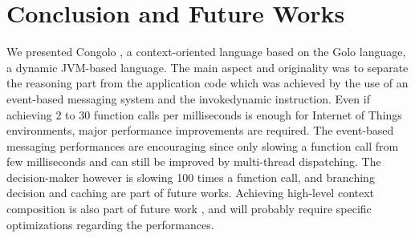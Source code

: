 \documentclass{sig-alternate}
\begin{document}
\section{Conclusion and Future Works}

We presented Congolo \cite{bmaingret_congolo_2014}, a context-oriented language based on the Golo language, a dynamic JVM-based language. The main aspect and originality was to separate the reasoning part from the application code which was achieved by the use of an event-based messaging system and the invokedynamic instruction. Even if achieving 2 to 30 function calls per milliseconds is enough for Internet of Things environments, major performance improvements are required. The event-based messaging performances are encouraging since only slowing a function call from few milliseconds and can still be improved by multi-thread dispatching. The decision-maker however is slowing 100 times a function call, and branching decision and caching are part of future works. Achieving high-level context composition is also part of future work \cite{vallejos2010}, and will probably require specific optimizations regarding the performances. 


\end{document}
